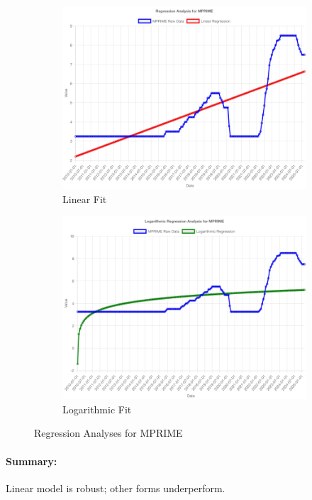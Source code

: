 \documentclass[11pt,a4paper]{article}
\begin{document}
\begin{figure}[htbp]
  \centering
  \begin{subfigure}[b]{0.48\textwidth}
    \includegraphics[width=\textwidth]{backend/analyses/MPRIME_analysis.png}
    \caption{Linear Fit}
  \end{subfigure}
  \hfill
  \begin{subfigure}[b]{0.48\textwidth}
    \includegraphics[width=\textwidth]{backend/analyses/MPRIME_log_analysis.png}
    \caption{Logarithmic Fit}
  \end{subfigure}
  \caption{Regression Analyses for MPRIME}
\end{figure}

\paragraph{Summary:}
Linear model is robust; other forms underperform.
\end{document}
